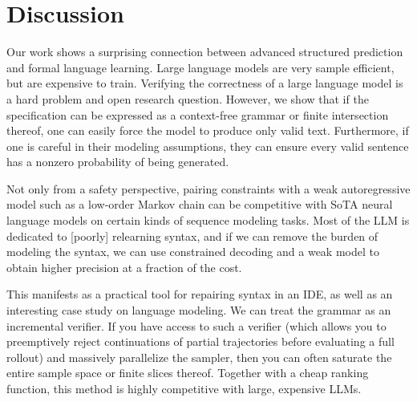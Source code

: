 \chapter{\rm\bfseries Discussion}
\label{ch:discussion}

Our work shows a surprising connection between advanced structured prediction and formal language learning. Large language models are very sample efficient, but are expensive to train. Verifying the correctness of a large language model is a hard problem and open research question. However, we show that if the specification can be expressed as a context-free grammar or finite intersection thereof, one can easily force the model to produce only valid text. Furthermore, if one is careful in their modeling assumptions, they can ensure every valid sentence has a nonzero probability of being generated.

Not only from a safety perspective, pairing constraints with a weak autoregressive model such as a low-order Markov chain can be competitive with SoTA neural language models on certain kinds of sequence modeling tasks. Most of the LLM is dedicated to [poorly] relearning syntax, and if we can remove the burden of modeling the syntax, we can use constrained decoding and a weak model to obtain higher precision at a fraction of the cost.

This manifests as a practical tool for repairing syntax in an IDE, as well as an interesting case study on language modeling. We can treat the grammar as an incremental verifier. If you have access to such a verifier (which allows you to preemptively reject continuations of partial trajectories before evaluating a full rollout) and massively parallelize the sampler, then you can often saturate the entire sample space or finite slices thereof. Together with a cheap ranking function, this method is highly competitive with large, expensive LLMs.



